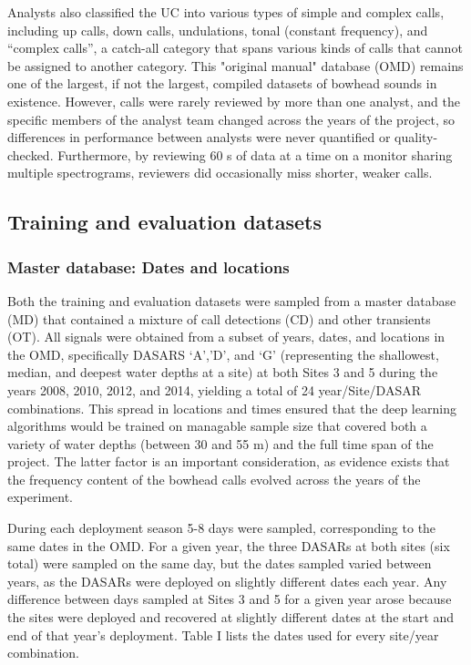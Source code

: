 \documentclass[preprint,NumberedRefs]{JASAnew}
\begin{document}
Analysts also classified the UC into various types of simple and complex calls, including up calls, down calls, undulations, tonal (constant frequency), and “complex calls”, a catch-all category that spans various kinds of calls that cannot be assigned to another category.  This "original manual" database (OMD) remains one of the largest, if not the largest, compiled datasets of bowhead sounds in existence. However, calls were rarely reviewed by more than one analyst, and the specific members of the analyst team changed across the years of the project, so differences in performance between analysts were never quantified or quality-checked.  Furthermore, by reviewing 60 s of data at a time on a monitor sharing multiple spectrograms, reviewers did occasionally miss shorter, weaker calls.

\subsection{Training and evaluation datasets}
\subsubsection{Master database: Dates and locations}
Both the training and evaluation datasets were sampled from a master database (MD) that contained a mixture of call detections (CD) and other transients (OT).  All signals were obtained from a subset of years, dates, and locations in the OMD, specifically DASARS ‘A’,’D’, and ‘G’ (representing the shallowest, median, and deepest water depths at a site) at both Sites 3 and 5 during the years 2008, 2010, 2012, and 2014, yielding a total of 24 year/Site/DASAR combinations.  This spread in locations and times ensured that the deep learning algorithms would be trained on managable sample size that covered both a variety of water depths (between 30 and 55 m) and  the full time span of the project.  The latter factor is an important consideration, as evidence exists that the frequency content of the bowhead calls evolved across the years of the experiment\cite{thode2017decadal}.  

 
 During each deployment season 5-8 days were sampled, corresponding to the same dates in the OMD.  For a given year, the three DASARs at both sites (six total) were sampled on the same day, but the dates sampled varied between years, as the DASARs were deployed on slightly different dates each year.  Any difference between days sampled at Sites 3 and 5 for a given year arose because the sites were deployed and recovered at slightly different dates at the start and end of that year’s deployment.  Table I lists the dates used for every site/year combination.
\end{document}
